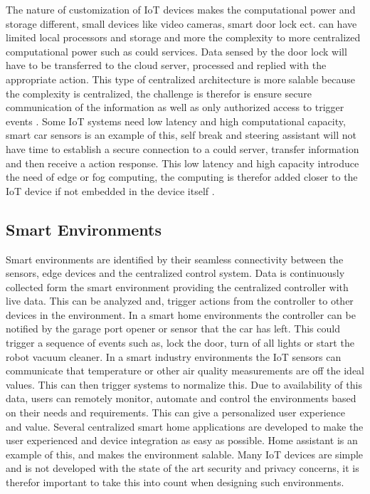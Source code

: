 The nature of customization of IoT devices makes the computational power and storage different, small devices like video cameras, smart door lock ect. can have limited local processors and storage and more the complexity to more centralized computational power such as could services. Data sensed by the door lock will have to be transferred to the cloud server, processed and replied with the appropriate action. This type of centralized architecture is more salable because the complexity is centralized, the challenge is therefor is ensure secure communication of the information as well as only authorized access to trigger events \cite{pavelic2018internet}. Some IoT systems need low latency and high computational capacity, smart car sensors is an example of this, self break and steering assistant will not have time to establish a secure connection to a could server, transfer information and then receive a action response. This low latency and high capacity introduce the need of edge or fog computing, the computing is therefor added closer to the IoT device if not embedded in the device itself \cite{mocrii2018iot}.  


\subsection{Smart Environments}
Smart environments are identified by their seamless connectivity between the sensors, edge devices and the centralized control system. Data is continuously collected form the smart environment providing the centralized controller with live data. This can be analyzed and, trigger actions from the controller to other devices in the environment. In a smart home environments the controller can be notified by the garage port opener or sensor that the car has left. This could trigger a sequence of events such as, lock the door, turn of all lights or start the robot vacuum cleaner. In a smart industry environments the IoT sensors can communicate that temperature or other air quality measurements are off the ideal values. This can then trigger systems to normalize this. Due to availability of this data, users can remotely monitor, automate and control the environments based on their needs and requirements. This can give a personalized user experience and value. Several centralized smart home applications are developed to make the user experienced and device integration as easy as possible. Home assistant \cite{homeassistans} is an example of this, and makes the environment salable. Many IoT devices are simple and is not developed with the state of the art security and privacy concerns, it is therefor important to take this into count when designing such environments. 

